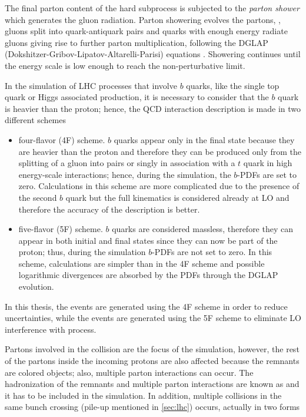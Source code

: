 The final parton content of the hard subprocess is subjected to the \textit{parton shower} which generates the gluon radiation. Parton showering evolves the partons, \ie, gluons split into quark-antiquark pairs and quarks with enough energy radiate gluons giving rise to further parton multiplication, following the DGLAP (Dokshitzer-Gribov-Lipatov-Altarelli-Parisi) equations \cite{dglap1,dglap2,dglap3}. Showering continues until the energy scale is low enough to reach the non-perturbative limit.

In the simulation of LHC processes that involve $b$ quarks, like the single top quark or Higgs associated production, it is necessary to consider that the $b$ quark is heavier than the proton; hence, the QCD interaction description is made in two different schemes \cite{schemes}

\begin{itemize}

\item four-flavor (4F) scheme. $b$ quarks appear only in the final state because they are heavier than the proton and therefore they can be produced only from the splitting of a gluon into pairs or singly in association with a $t$ quark in high energy-scale interactions; hence, during the simulation, the $b$-PDFs are set to zero. Calculations in this scheme are more complicated due to the presence of the second $b$ quark but the full kinematics is considered already at LO and therefore the accuracy of the description is better.   

\item five-flavor (5F) scheme. $b$ quarks are considered massless, therefore they can appear in both initial and final states since they can now be part of the proton; thus, during the simulation $b$-PDFs are not set to zero. In this scheme, calculations are simpler than in the 4F scheme and possible logarithmic divergences are absorbed by the PDFs through the DGLAP evolution.   
\end{itemize}

In this thesis, the \tHq events are generated using the 4F scheme in order to reduce uncertainties, while the \tHW events are generated using the 5F scheme to eliminate LO interference with \ttH process\cite{demartin}.

Partons involved in the \pp collision are the focus of the simulation, however, the rest of the partons inside the incoming protons are also affected because the remnants are colored objects; also, multiple parton interactions can occur. The hadronization of the remnants and multiple parton interactions are known as  and it has to be included in the simulation. In addition, multiple \pp collisions in the same bunch crossing (pile-up mentioned in \ref{sec:lhc}) occurs, actually in two forms

